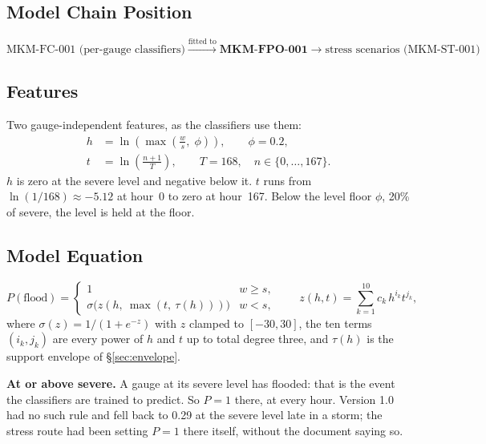 \documentclass[11pt,a4paper]{article}
\begin{document}
\subsection{Model Chain Position}
\[
\text{MKM-FC-001 (per-gauge classifiers)}
\xrightarrow{\text{fitted to}}
\textbf{MKM-FPO-001}
\to \text{stress scenarios (MKM-ST-001)}
\]

\mkmframework

\subsection{Features}
Two gauge-independent features, as the classifiers use them:
\begin{align}
h &= \ln\!\left(\max\!\left(\frac{w}{s},\; \phi\right)\right), \qquad \phi = 0.2,
    \label{eq:h} \\
t &= \ln\!\left(\frac{n+1}{T}\right), \qquad T = 168, \quad n\in\{0,\dots,167\}.
    \label{eq:t}
\end{align}
$h$ is zero at the severe level and negative below it. $t$ runs from
$\ln(1/168)\approx-5.12$ at hour~0 to zero at hour~167. Below the level floor
$\phi$, 20\% of severe, the level is held at the floor.

\subsection{Model Equation}
\begin{equation}
\label{eq:model}
P(\text{flood}) =
\begin{cases}
1 & w \ge s, \\[2pt]
\sigma\big(z(h,\ \max(t,\ \tau(h)))\big) & w < s,
\end{cases}
\qquad
z(h,t) = \sum_{k=1}^{10} c_k\, h^{i_k} t^{j_k},
\end{equation}
where $\sigma(z) = 1/(1+e^{-z})$ with $z$ clamped to $[-30, 30]$, the ten terms
$(i_k, j_k)$ are every power of $h$ and $t$ up to total degree three, and
$\tau(h)$ is the support envelope of \S\ref{sec:envelope}.

\textbf{At or above severe.} A gauge at its severe level has flooded: that is the
event the classifiers are trained to predict. So $P=1$ there, at every hour. Version
1.0 had no such rule and fell back to 0.29 at the severe level late in a storm; the
stress route had been setting $P=1$ there itself, without the document saying so.
\end{document}
